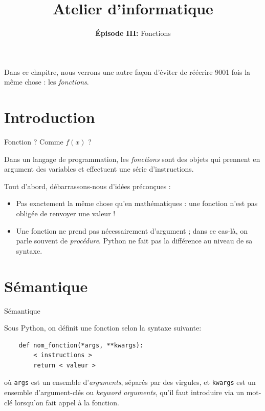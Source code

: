 

\title{Atelier d'informatique}
\subtitle{\textbf{Épisode III:} Fonctions}



\begin{frame}
\titlepage
\pause

Dans ce chapitre, nous verrons une autre façon d'éviter de réécrire 9001 fois la même chose : les \textit{fonctions}.
\end{frame}

\frame{\tableofcontents}

\section{Introduction}

\begin{frame}[fragile]{Fonction ? Comme $f(x)$ ?}

Dans un langage de programmation, les \textit{fonctions} sont des objets qui prennent en argument des variables et effectuent une série d'instructions.
\pause
\vspace{1em}

Tout d'abord, débarrassons-nous d'idées préconçues :
\pause

\begin{itemize}[<+->]
\item Pas exactement la même chose qu'en mathématiques : une fonction n'est pas obligée de renvoyer une valeur !
\item Une fonction ne prend pas nécessairement d'argument ; dans ce cas-là, on parle souvent de \textit{procédure}. Python ne fait pas la différence au niveau de sa syntaxe.
\end{itemize}

\end{frame}

\section{Sémantique}

\begin{frame}[fragile]{Sémantique}

	Sous Python, on définit une fonction selon la syntaxe suivante:\pause
	\begin{lstlisting}
	def nom_fonction(*args, **kwargs):
	    < instructions >
	    return < valeur >
	    \end{lstlisting}
	\pause
	où \lstinline|args| est un ensemble d'\textit{arguments}, séparés par des virgules, et \lstinline|kwargs| est un ensemble d'argument-clés ou \textit{keyword arguments}, qu'il faut introduire via un mot-clé lorsqu'on fait appel à la fonction.
\end{frame}

